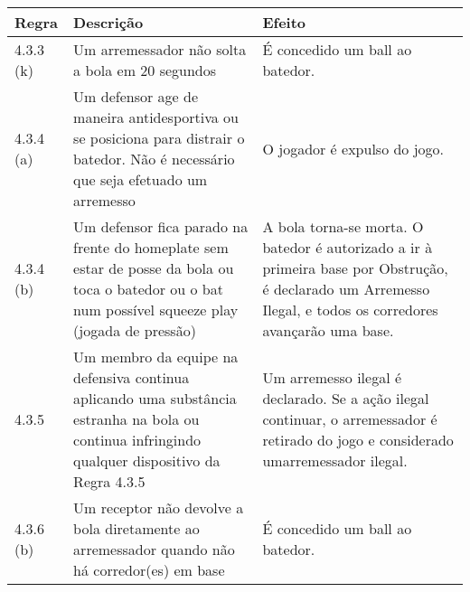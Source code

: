 {\footnotesize\begin{tabular}{p{15mm}p{80mm}p{70mm}}
		Regra& Descrição & Efeito\\\hline

		4.3.3 (k)  & Um arremessador não solta a bola em 20 segundos

		& É concedido um \gls{ball} ao batedor.

		\\[4mm] 4.3.4 (a)& Um defensor age de maneira antidesportiva ou se posiciona para distrair o batedor. Não é necessário que seja efetuado um arremesso

		& O jogador é expulso do jogo.\\[4mm]

		4.3.4 (b) & Um defensor fica parado na frente do \gls{homeplate} sem estar de posse da bola ou toca o batedor ou o \gls{bat} num possível \gls{squeeze play} (jogada de pressão)

		& A bola torna-se morta. O batedor é autorizado a ir à primeira base por Obstrução, é declarado um Arremesso Ilegal, e todos os corredores avançarão uma base.\\[4mm]

		4.3.5 & Um membro da equipe na defensiva continua aplicando uma substância estranha na bola ou continua infringindo qualquer dispositivo da  Regra 4.3.5

		& Um arremesso ilegal é declarado. Se a ação ilegal continuar, o arremessador é retirado do jogo e considerado umarremessador ilegal.\\[4mm]

		4.3.6 (b) & Um receptor não devolve a bola diretamente ao arremessador quando não há corredor(es) em base

		& É concedido um \gls{ball} ao batedor.\\[4mm]
\end{tabular}}

